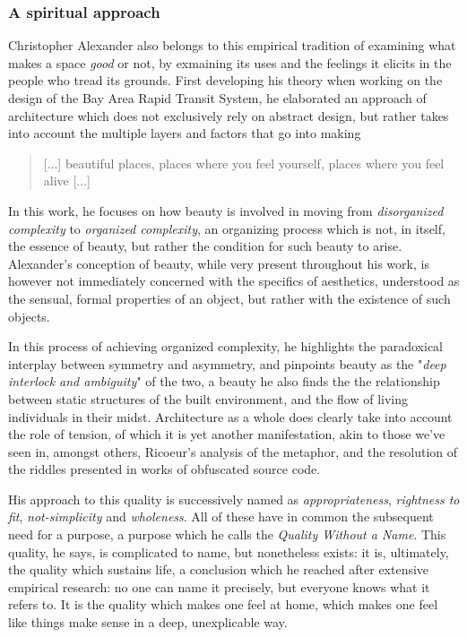 \documentclass{article}
\begin{document}
\subsubsection{A spiritual approach}

Christopher Alexander also belongs to this empirical tradition of examining what makes a space \emph{good} or not, by exmaining its uses and the feelings it elicits in the people who tread its grounds. First developing his theory when working on the design of the Bay Area Rapid Transit System, he elaborated an approach of architecture which does not exclusively rely on abstract design, but rather takes into account the multiple layers and factors that go into making 

\begin{quote}
  [...] beautiful places, places where you feel yourself, places where you feel alive\cite{alexander_timeless_1979} [...]
\end{quote}

In this work, he focuses on how beauty is involved in moving from \emph{disorganized complexity} to \emph{organized complexity}, an organizing process which is not, in itself, the essence of beauty, but rather the condition for such beauty to arise. Alexander's conception of beauty, while very present throughout his work, is however not immediately concerned with the specifics of aesthetics, understood as the sensual, formal properties of an object, but rather with the existence of such objects.

In this process of achieving organized complexity, he highlights the paradoxical interplay between symmetry and asymmetry, and pinpoints beauty as the "\emph{deep interlock and ambiguity}" of the two, a beauty he also finds the the relationship between static structures of the built environment, and the flow of living individuals in their midst. Architecture as a whole does clearly take into account the role of tension, of which it is yet another manifestation, akin to those we've seen in, amongst others, Ricoeur's analysis of the metaphor, and the resolution of the riddles presented in works of obfuscated source code.

His approach to this quality is successively named as \emph{appropriateness}, \emph{rightness to fit}, \emph{not-simplicity} and \emph{wholeness}. All of these have in common the subsequent need for a purpose, a purpose which he calls the \emph{Quality Without a Name}. This quality, he says, is complicated to name, but nonetheless exists: it is, ultimately, the quality which sustains life, a conclusion which he reached after extensive empirical research: no one can name it precisely, but everyone knows what it refers to. It is the quality which makes one feel at home, which makes one feel like things make sense in a deep, unexplicable way.
\end{document}
